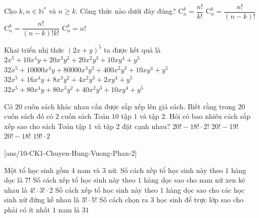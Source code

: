 \begin{ex}%
Cho $k, n \in \mathbb{N}^*$ và $n \geq k$. Công thức nào dưới đây đúng?
\choice
{$\mathrm{C}_n^k=\dfrac{n !}{k !}$}
{$\mathrm{C}_n^k=\dfrac{n !}{(n-k) !}$}
{\True $\mathrm{C}_n^k=\dfrac{n !}{(n-k) ! k !}$}
{$\mathrm{C}_n^k=n!$}
\end{ex}

\begin{ex}%
Khai triển nhị thức $(2x+y)^5$ ta được kết quả là
\choice
{$2x^5+10x^4y+20x^3y^2+20x^2y^3+10xy^4+y^5$}
{$32x^5+10000x^4y+80000x^3y^2+400x^2y^3+10xy^4+y^5$}
{$32x^5+16x^4y+8x^3y^2+4x^2y^3+2xy^4+y^5$}
{\True$32x^5+80x^4y+80x^3y^2+40x^2y^3+10xy^4+y^5$}
\end{ex}

\begin{ex}%
Có $20$ cuốn sách khác nhau cần được sắp xếp lên giá sách. Biết rằng trong $20$ cuốn sách đó có $2$ cuốn sách Toán $10$ tập $1$ và tập $2$. Hỏi có bao nhiêu cách sắp xếp sao cho sách Toán tập $1$ và tập $2$ đặt cạnh nhau?
\choice
{$20!-18!\cdot 2!$}
{$20!-19!$}
{$20!-18!$}
{\True $19!\cdot 2$}
\end{ex}

\cauds
{}[ans/10-CK1-Chuyen-Hung-Vuong-Phan-2]

\begin{ex}%
Một tổ học sinh gồm $4$ nam và $3$ nữ.
\choiceTF
{\True Số cách xếp tổ học sinh này theo $1$ hàng dọc là $ 7!$}
{Số cách xếp tổ học sinh này theo $1$ hàng dọc sao cho nam nữ xen kẻ nhau là $ 4!\cdot3!\cdot2$}
{\True Số cách xếp tổ học sinh này theo $1$ hàng dọc sao cho các học sinh nữ đứng kề nhau là $ 3!\cdot5!$}
{Số cách chọn ra $3$ học sinh để trực lớp sao cho phải có ít nhất $1$ nam là $31$}
\end{ex}

